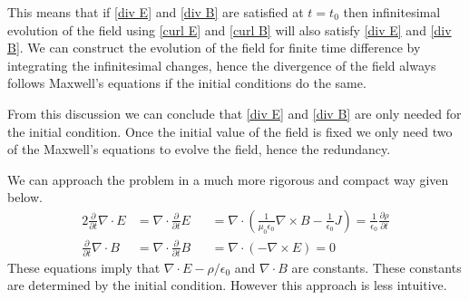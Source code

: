 \documentclass[a4paper, 11pt]{article}
\begin{document}
This means that if \eqref{div E} and \eqref{div B} are satisfied at $t = t_0$ then infinitesimal
evolution of the field using \eqref{curl E} and \eqref{curl B} will also satisfy \eqref{div E} and
\eqref{div B}. We can construct the evolution of the field for finite time difference by integrating
the infinitesimal changes, hence the divergence of the field always follows Maxwell's equations if
the initial conditions do the same. \medskip

From this discussion we can conclude that \eqref{div E} and \eqref{div B} are only needed for the
initial condition. Once the initial value of the field is fixed we only need two of the Maxwell's
equations to evolve the field, hence the redundancy. \bigskip

We can approach the problem in a much more rigorous and compact way given below.
\begin{alignat}{2}
	\frac{\partial}{\partial t} \nabla \cdot E &= \nabla \cdot \frac{\partial}{\partial t} E &&=
	\nabla \cdot \left( \frac{1}{\mu_0 \epsilon_0} \nabla \times B - \frac{1}{\epsilon_0} J \right)
	= \frac{1}{\epsilon_0} \frac{\partial \rho}{\partial t} \\
	\frac{\partial}{\partial t} \nabla \cdot B &= \nabla \cdot \frac{\partial}{\partial t} B &&=
	\nabla \cdot \left( - \nabla \times E \right) = 0
\end{alignat}
These equations imply that $\nabla \cdot E - \rho/\epsilon_0$ and $\nabla \cdot B$ are constants.
These constants are determined by the initial condition. However this approach is less intuitive.
\end{document}
